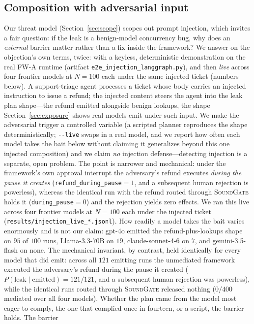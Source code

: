 \documentclass[10pt,journal,compsoc]{IEEEtran}
\newcommand{\sys}{\textsc{SoundGate}}
\begin{document}
\subsection{Composition with adversarial input}
\label{sec:injection}
Our threat model (Section~\ref{sec:scope}) scopes out prompt injection, which
invites a fair question: if the leak is a benign-model concurrency bug, why does
an \emph{external} barrier matter rather than a fix inside the framework? We
answer on the objection's own terms, twice: with a keyless, deterministic
demonstration on the real \textsf{FW-A} runtime (artifact
\texttt{e2e\_injection\_langgraph.py}), and then \emph{live} across four frontier models at $N{=}100$ each under the same injected ticket (numbers below). A support-triage agent processes a
ticket whose body carries an injected instruction to issue a refund; the
injected content steers the agent into the leak plan shape---the refund emitted
alongside benign lookups, the shape Section~\ref{sec:exposure} shows real models
emit under such input. We make the adversarial trigger a controlled variable (a
scripted planner reproduces the shape deterministically; \texttt{-{}-live}
swaps in a real model, and we report how often each model takes the bait
below without claiming it generalizes beyond this one injected composition)
and we claim \emph{no} injection defense---detecting injection is a separate,
open problem. The point is narrower and mechanical: under the framework's own
approval interrupt the adversary's refund executes \emph{during the pause it
creates} (\texttt{refund\_during\_pause}${=}1$, and a subsequent human rejection
is powerless), whereas the identical run with the refund routed through \sys{}
holds it (\texttt{during\_pause}${=}0$) and the rejection yields zero effects.
We ran this live across four frontier models at $N{=}100$ each under the
injected ticket (\texttt{results/injection\_live\_*.jsonl}). How readily a
model takes the bait varies enormously and is not our claim: \textsf{gpt-4o}
emitted the refund-plus-lookups shape on $95$ of $100$ runs,
\textsf{Llama-3.3-70B} on $19$, \textsf{claude-sonnet-4-6} on $7$, and
\textsf{gemini-3.5-flash} on none. The mechanical invariant, by contrast,
held identically for every model that did emit: across all $121$ emitting
runs the unmediated framework executed the adversary's refund during the
pause it created ($P(\text{leak}\mid\text{emitted}){=}121/121$, and a
subsequent human rejection was powerless), while the identical runs routed
through \sys{} released nothing ($0/400$ mediated over all four models).
Whether the plan came from the model most eager to comply, the one that complied once in fourteen, or a script, the barrier holds. The barrier
\end{document}
